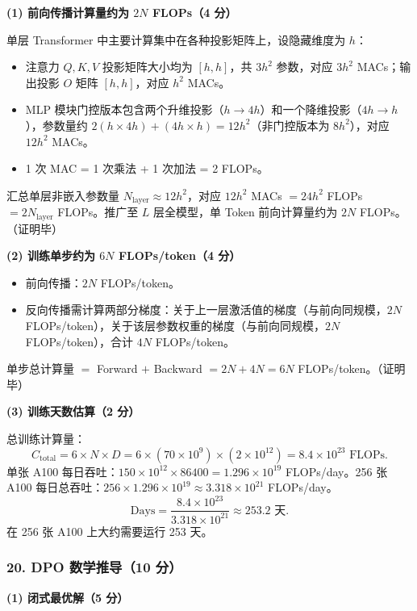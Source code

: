 \documentclass[11pt,a4paper]{article}
\begin{document}
\noindent\textbf{(1) 前向传播计算量约为 $2N$ FLOPs（4 分）}

单层 Transformer 中主要计算集中在各种投影矩阵上，设隐藏维度为 $h$：
\begin{itemize}[leftmargin=2em,itemsep=0pt,parsep=0pt,topsep=0pt]
  \item 注意力 $Q,K,V$ 投影矩阵大小均为 $[h,h]$，共 $3h^2$ 参数，对应 $3h^2$ MACs；输出投影 $O$ 矩阵 $[h,h]$，对应 $h^2$ MACs。
  \item MLP 模块门控版本包含两个升维投影（$h\to 4h$）和一个降维投影（$4h\to h$），参数量约 $2(h\times4h)+(4h\times h)=12h^2$（非门控版本为 $8h^2$），对应 $12h^2$ MACs。
  \item 1 次 MAC = 1 次乘法 + 1 次加法 = 2 FLOPs。
\end{itemize}
汇总单层非嵌入参数量 $N_{\text{layer}}\approx 12h^2$，对应 $12h^2$ MACs $=24h^2$ FLOPs $=2N_{\text{layer}}$ FLOPs。推广至 $L$ 层全模型，单 Token 前向计算量约为 $2N$ FLOPs。（证明毕）

\noindent\textbf{(2) 训练单步约为 $6N$ FLOPs/token（4 分）}

\begin{itemize}[leftmargin=2em,itemsep=0pt,parsep=0pt,topsep=0pt]
  \item 前向传播：$2N$ FLOPs/token。
  \item 反向传播需计算两部分梯度：关于上一层激活值的梯度（与前向同规模，$2N$ FLOPs/token），关于该层参数权重的梯度（与前向同规模，$2N$ FLOPs/token），合计 $4N$ FLOPs/token。
\end{itemize}
单步总计算量 $=$ Forward $+$ Backward $=2N+4N=6N$ FLOPs/token。（证明毕）

\noindent\textbf{(3) 训练天数估算（2 分）}

总训练计算量：
\[
C_{\text{total}}=6\times N\times D=6\times(70\times10^{9})\times(2\times10^{12})=8.4\times10^{23}\text{ FLOPs}.
\]
单张 A100 每日吞吐：$150\times10^{12}\times86400=1.296\times10^{19}$ FLOPs/day。256 张 A100 每日总吞吐：$256\times1.296\times10^{19}\approx3.318\times10^{21}$ FLOPs/day。
\[
\text{Days}=\frac{8.4\times10^{23}}{3.318\times10^{21}}\approx253.2\text{ 天}.
\]
在 256 张 A100 上大约需要运行 253 天。

\subsubsection*{20. DPO 数学推导（10 分）}

\noindent\textbf{(1) 闭式最优解（5 分）}
\end{document}
